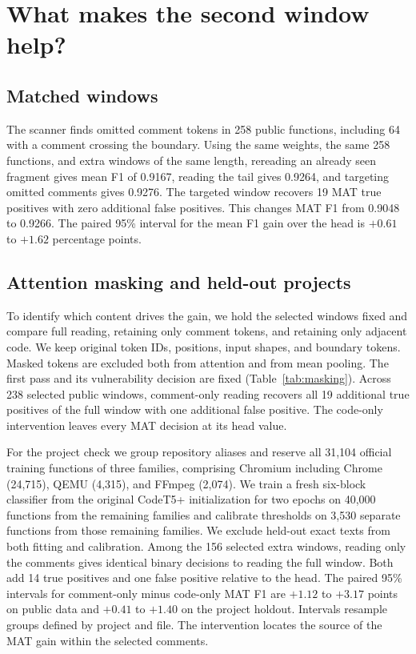 \documentclass[10pt,conference]{IEEEtran}
\begin{document}
\section{What makes the second window help?}
\subsection{Matched windows}
The scanner finds omitted comment tokens in 258 public functions, including 64 with a comment crossing the boundary. Using the same weights, the same 258 functions, and extra windows of the same length, rereading an already seen fragment gives mean F1 of 0.9167, reading the tail gives 0.9264, and targeting omitted comments gives 0.9276. The targeted window recovers 19 MAT true positives with zero additional false positives. This changes MAT F1 from 0.9048 to 0.9266. The paired 95\% interval for the mean F1 gain over the head is $+0.61$ to $+1.62$ percentage points.


\subsection{Attention masking and held-out projects}
To identify which content drives the gain, we hold the selected windows fixed and compare full reading, retaining only comment tokens, and retaining only adjacent code. We keep original token IDs, positions, input shapes, and boundary tokens. Masked tokens are excluded both from attention and from mean pooling. The first pass and its vulnerability decision are fixed (Table~\ref{tab:masking}). Across 238 selected public windows, comment-only reading recovers all 19 additional true positives of the full window with one additional false positive. The code-only intervention leaves every MAT decision at its head value.

For the project check we group repository aliases and reserve all 31,104 official training functions of three families, comprising Chromium including Chrome (24,715), QEMU (4,315), and FFmpeg (2,074). We train a fresh six-block classifier from the original CodeT5+ initialization for two epochs on 40,000 functions from the remaining families and calibrate thresholds on 3,530 separate functions from those remaining families. We exclude held-out exact texts from both fitting and calibration. Among the 156 selected extra windows, reading only the comments gives identical binary decisions to reading the full window. Both add 14 true positives and one false positive relative to the head. The paired 95\% intervals for comment-only minus code-only MAT F1 are $+1.12$ to $+3.17$ points on public data and $+0.41$ to $+1.40$ on the project holdout. Intervals resample groups defined by project and file. The intervention locates the source of the MAT gain within the selected comments.
\end{document}
